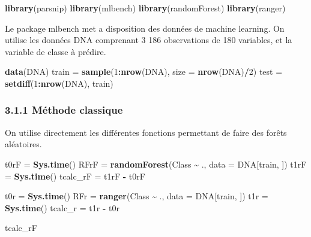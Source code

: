\documentclass[]{article}
\newenvironment{Shaded}{\begin{snugshade}}{\end{snugshade}}
\newcommand{\DataTypeTok}[1]{\textcolor[rgb]{0.13,0.29,0.53}{#1}}
\newcommand{\DecValTok}[1]{\textcolor[rgb]{0.00,0.00,0.81}{#1}}
\newcommand{\KeywordTok}[1]{\textcolor[rgb]{0.13,0.29,0.53}{\textbf{#1}}}
\newcommand{\NormalTok}[1]{#1}
\newcommand{\OperatorTok}[1]{\textcolor[rgb]{0.81,0.36,0.00}{\textbf{#1}}}
\newcommand{\StringTok}[1]{\textcolor[rgb]{0.31,0.60,0.02}{#1}}
\begin{document}
\begin{Shaded}
\begin{Highlighting}[]
\KeywordTok{library}\NormalTok{(parsnip)}
\KeywordTok{library}\NormalTok{(mlbench) }
\KeywordTok{library}\NormalTok{(randomForest)}
\KeywordTok{library}\NormalTok{(ranger)}
\end{Highlighting}
\end{Shaded}

Le package mlbench met a disposition des données de machine learning. On
utilise les données DNA comprenant 3 186 observations de 180 variables,
et la variable de classe à prédire.

\begin{Shaded}
\begin{Highlighting}[]
\KeywordTok{data}\NormalTok{(DNA)}
\NormalTok{train =}\StringTok{ }\KeywordTok{sample}\NormalTok{(}\DecValTok{1}\OperatorTok{:}\KeywordTok{nrow}\NormalTok{(DNA), }\DataTypeTok{size =} \KeywordTok{nrow}\NormalTok{(DNA)}\OperatorTok{/}\DecValTok{2}\NormalTok{)}
\NormalTok{test  =}\StringTok{ }\KeywordTok{setdiff}\NormalTok{(}\DecValTok{1}\OperatorTok{:}\KeywordTok{nrow}\NormalTok{(DNA), train)}
\end{Highlighting}
\end{Shaded}

\hypertarget{methode-classique}{%
\subsubsection{3.1.1 Méthode classique}\label{methode-classique}}

On utilise directement les différentes fonctions permettant de faire des
forêts aléatoires.

\begin{Shaded}
\begin{Highlighting}[]
\NormalTok{t0rF =}\StringTok{ }\KeywordTok{Sys.time}\NormalTok{() }
\NormalTok{RFrF =}\StringTok{ }\KeywordTok{randomForest}\NormalTok{(Class }\OperatorTok{\textasciitilde{}}\StringTok{ }\NormalTok{., }\DataTypeTok{data =}\NormalTok{ DNA[train, ])}
\NormalTok{t1rF =}\StringTok{ }\KeywordTok{Sys.time}\NormalTok{() }
\NormalTok{tcalc\_rF =}\StringTok{ }\NormalTok{t1rF }\OperatorTok{{-}}\StringTok{ }\NormalTok{t0rF}

\NormalTok{t0r =}\StringTok{ }\KeywordTok{Sys.time}\NormalTok{() }
\NormalTok{RFr =}\StringTok{ }\KeywordTok{ranger}\NormalTok{(Class }\OperatorTok{\textasciitilde{}}\StringTok{ }\NormalTok{., }\DataTypeTok{data =}\NormalTok{ DNA[train, ])}
\NormalTok{t1r =}\StringTok{ }\KeywordTok{Sys.time}\NormalTok{() }
\NormalTok{tcalc\_r =}\StringTok{ }\NormalTok{t1r }\OperatorTok{{-}}\StringTok{ }\NormalTok{t0r}

\NormalTok{tcalc\_rF}
\end{Highlighting}
\end{Shaded}
\end{document}
